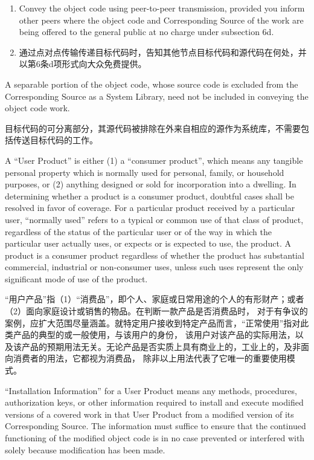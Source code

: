\documentclass[11pt]{article}
\begin{document}
\begin{enumerate}
\begin{enumerate}
          \item Convey the object code using peer-to-peer transmission, provided
                you inform other peers where the object code and Corresponding
                Source of the work are being offered to the general public at no
                charge under subsection 6d.
          \item 通过点对点传输传递目标代码时，告知其他节点目标代码和源代码在何处，并以第6条d项形式向大众免费提供。

        \end{enumerate}

        A separable portion of the object code, whose source code is excluded
        from the Corresponding Source as a System Library, need not be
        included in conveying the object code work.

        目标代码的可分离部分，其源代码被排除在外来自相应的源作为系统库，不需要包括传送目标代码的工作。

        A ``User Product'' is either (1) a ``consumer product'', which means any
        tangible personal property which is normally used for personal, family,
        or household purposes, or (2) anything designed or sold for incorporation
        into a dwelling.  In determining whether a product is a consumer product,
        doubtful cases shall be resolved in favor of coverage.  For a particular
        product received by a particular user, ``normally used'' refers to a
        typical or common use of that class of product, regardless of the status
        of the particular user or of the way in which the particular user
        actually uses, or expects or is expected to use, the product.  A product
        is a consumer product regardless of whether the product has substantial
        commercial, industrial or non-consumer uses, unless such uses represent
        the only significant mode of use of the product.

        “用户产品”指（1）“消费品”，即个人、家庭或日常用途的个人的有形财产；或者（2）面向家庭设计或销售的物品。在判断一款产品是否消费品时，
        对于有争议的案例，应扩大范围尽量涵盖。就特定用户接收到特定产品而言，“正常使用”指对此类产品的典型的或一般使用，与该用户的身份，
        该用户对该产品的实际用法，以及该产品的预期用法无关。无论产品是否实质上具有商业上的，工业上的，及非面向消费者的用法，它都视为消费品，
        除非以上用法代表了它唯一的重要使用模式。


        ``Installation Information'' for a User Product means any methods,
        procedures, authorization keys, or other information required to install
        and execute modified versions of a covered work in that User Product from
        a modified version of its Corresponding Source.  The information must
        suffice to ensure that the continued functioning of the modified object
        code is in no case prevented or interfered with solely because
        modification has been made.


\end{enumerate}
\end{document}
